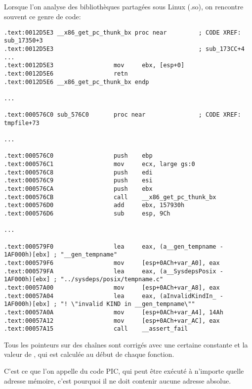 \subsection{\CapitalPICcode}
\myindex{\PICcode}
\label{sec:PIC}

Lorsque l'on analyse des bibliothèques partagées sous Linux (.so), on rencontre souvent
ce genre de code:

\begin{lstlisting}[caption=libc-2.17.so x86,style=customasmx86]
.text:0012D5E3 __x86_get_pc_thunk_bx proc near         ; CODE XREF: sub_17350+3
.text:0012D5E3                                         ; sub_173CC+4 ...
.text:0012D5E3                 mov     ebx, [esp+0]
.text:0012D5E6                 retn
.text:0012D5E6 __x86_get_pc_thunk_bx endp

...

.text:000576C0 sub_576C0       proc near               ; CODE XREF: tmpfile+73

...

.text:000576C0                 push    ebp
.text:000576C1                 mov     ecx, large gs:0
.text:000576C8                 push    edi
.text:000576C9                 push    esi
.text:000576CA                 push    ebx
.text:000576CB                 call    __x86_get_pc_thunk_bx
.text:000576D0                 add     ebx, 157930h
.text:000576D6                 sub     esp, 9Ch

...

.text:000579F0                 lea     eax, (a__gen_tempname - 1AF000h)[ebx] ; "__gen_tempname"
.text:000579F6                 mov     [esp+0ACh+var_A0], eax
.text:000579FA                 lea     eax, (a__SysdepsPosix - 1AF000h)[ebx] ; "../sysdeps/posix/tempname.c"
.text:00057A00                 mov     [esp+0ACh+var_A8], eax
.text:00057A04                 lea     eax, (aInvalidKindIn_ - 1AF000h)[ebx] ; "! \"invalid KIND in __gen_tempname\""
.text:00057A0A                 mov     [esp+0ACh+var_A4], 14Ah
.text:00057A12                 mov     [esp+0ACh+var_AC], eax
.text:00057A15                 call    __assert_fail
\end{lstlisting}


Tous les pointeurs sur des chaînes sont corrigés avec une certaine constante et la valeur de \EBX,
qui est calculée au début de chaque fonction.

C'est ce que l'on appelle du code \ac{PIC}, qui peut être exécuté à n'importe quelle adresse mémoire, c'est pourquoi il ne doit contenir aucune adresse absolue.

